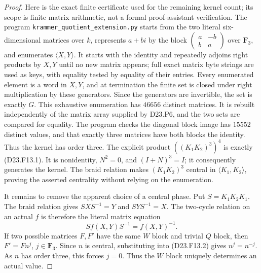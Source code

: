 \begin{proof}
Here is the exact finite certificate used for the remaining
kernel count; its scope is finite matrix arithmetic, not a
formal proof-assistant verification.  The program
\texttt{krammer\_quotient\_extension.py} starts from the two
literal six-dimensional matrices over $k$, represents
$a+bi$ by the block
$\left(\begin{smallmatrix}a&-b\\b&a\end{smallmatrix}\right)$
over $\mathbf F_3$, and enumerates $\langle X,Y\rangle$.
It starts with the identity and repeatedly adjoins right
products by $X,Y$ until no new matrix appears; full exact
matrix byte strings are used as keys, with equality tested
by equality of their entries.  Every enumerated element is
a word in $X,Y$, and at termination the finite set is closed
under right multiplication by these generators.  Since
the generators are invertible, the set is exactly $G$.
This exhaustive enumeration has $46656$ distinct matrices.
It is rebuilt independently of the matrix array supplied
by D23.P6, and the two sets are compared for equality.
The program checks the diagonal block image has $15552$
distinct values, and that exactly three matrices have both
blocks the identity.  Thus the kernel has order three.
The explicit product $((K_1K_2)^3)^4$ is exactly (D23.F13.1).
It is nonidentity, $N^2=0$, and $(I+N)^3=I$; it consequently
generates the kernel.  The braid relation makes
$(K_1K_2)^3$ central in $\langle K_1,K_2\rangle$, proving
the asserted centrality without relying on the enumeration.

It remains to remove the apparent choice of a central phase.
Put $S=K_1K_2K_1$.  The braid relation gives
$SXS^{-1}=Y$ and $SYS^{-1}=X$.  The two-cycle relation on
an actual $f$ is therefore the literal matrix equation
\[
 S f(X,Y)S^{-1}=f(X,Y)^{-1}.
\tag{D23.F13.2}
\]
If two possible matrices $F,F'$ have the same $W$ block
and trivial $Q$ block, then $F'=Fn^j$, $j\in\mathbf F_3$.
Since $n$ is central, substituting into (D23.F13.2) gives
$n^j=n^{-j}$.  As $n$ has order three, this forces $j=0$.
Thus the $W$ block uniquely determines an actual value.


\end{proof}
